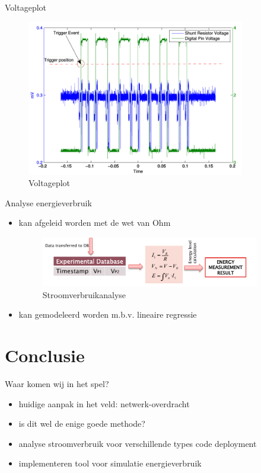 \documentclass[presentation, bigger]{beamer}
\begin{document}
\begin{frame}[label=sec-3-4]{Voltageplot}
  \begin{figure}
    \centering
    \includegraphics[width=0.85\textwidth,keepaspectration=true]{elek/energy_measurement_plot.png}
    \caption{Voltageplot}
  \end{figure}
\end{frame}

\begin{frame}[label=sec-3-5]{Analyse energieverbruik}
  \begin{itemize}
  \item kan afgeleid worden met de wet van Ohm
    \begin{figure}
      \centering
      \includegraphics[width=0.9\textwidth,keepaspectration=true]{elek/diag2}

      \caption{Stroomverbruikanalyse}
    \end{figure}
  \item kan gemodeleerd worden m.b.v. lineaire regressie
  \end{itemize}
\end{frame}
\section{Conclusie}
\label{sec-4}
\begin{frame}[label=sec-4-1]{Waar komen wij in het spel?}
  \begin{itemize}
  \item huidige aanpak in het veld: netwerk-overdracht
  \item is dit wel de enige goede methode?
  \item analyse stroomverbruik voor verschillende types code deployment
  \item implementeren tool voor simulatie energieverbruik
  \end{itemize}
\end{frame}
\end{document}
